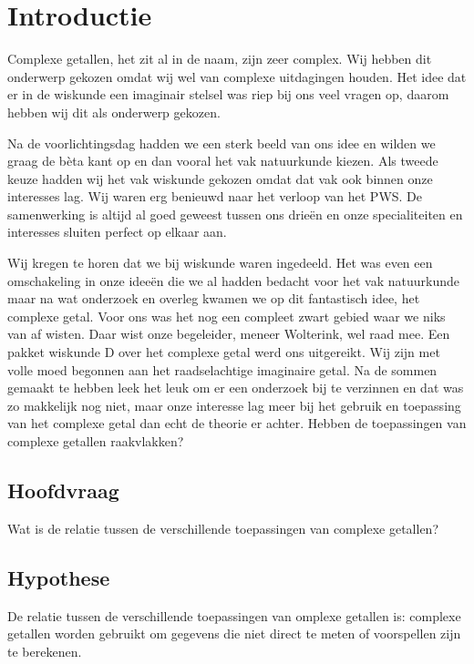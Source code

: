 \documentclass[11pt,fleqn]{book} %
\begin{document}

\chapter{Introductie}

Complexe getallen, het zit al in de naam, zijn zeer complex. Wij hebben dit onderwerp gekozen omdat wij wel van complexe uitdagingen houden. Het idee dat er in de wiskunde een imaginair stelsel was riep bij ons veel vragen op, daarom hebben wij dit als onderwerp gekozen.

Na de voorlichtingsdag hadden we een sterk beeld van ons idee en wilden we graag de bèta kant op en dan vooral het vak natuurkunde kiezen. Als tweede keuze hadden wij het vak wiskunde gekozen omdat dat vak ook binnen onze interesses lag. Wij waren erg benieuwd naar het verloop van het PWS. De samenwerking is altijd al goed geweest tussen ons drieën en onze specialiteiten en interesses sluiten perfect op elkaar aan.

Wij kregen te horen dat we bij wiskunde waren ingedeeld. Het was even een omschakeling in onze ideeën die we al hadden bedacht voor het vak natuurkunde maar na wat onderzoek en overleg kwamen we op dit fantastisch idee, het complexe getal. Voor ons was het nog een compleet zwart gebied waar we niks van af wisten. Daar wist onze begeleider, meneer Wolterink, wel raad mee. Een pakket wiskunde D over het complexe getal werd ons uitgereikt. Wij zijn met volle moed begonnen aan het raadselachtige imaginaire getal. Na de sommen gemaakt te hebben leek het leuk om er een onderzoek bij te verzinnen en dat was zo makkelijk nog niet, maar onze interesse lag meer bij het gebruik en toepassing van het complexe getal dan echt de theorie er achter. Hebben de toepassingen van complexe getallen raakvlakken?

\section{Hoofdvraag}
Wat is de relatie tussen de verschillende toepassingen van complexe getallen? 

\section{Hypothese}
De relatie tussen de verschillende toepassingen van omplexe getallen is: complexe getallen worden gebruikt om gegevens die niet direct te meten of voorspellen zijn te berekenen.
\end{document}
